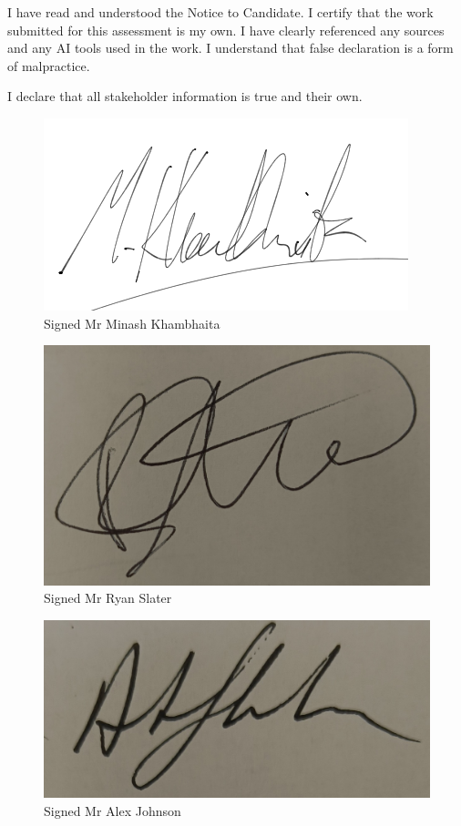 
\begin{declaration}

I have read and understood the Notice to Candidate. I certify that the work submitted for this assessment is my own. I have clearly referenced any sources and any AI tools used in the work. I understand that false declaration is a form of malpractice.

\end{declaration}


\begin{center}
I declare that all stakeholder information is true and their own.
\end{center}

\begin{figure}[!htbp]
	\centering
	\includegraphics[width=0.3\linewidth]{Images/sigdad.png}
	\caption{Signed Mr Minash Khambhaita}
\end{figure}


\begin{figure}[!htbp]
    \centering
    \includegraphics[width=0.3\linewidth]{IMG_20241213_124653362.jpg}
    \caption{Signed Mr Ryan Slater}
\end{figure}

\begin{figure}[!htbp]
    \centering
    \includegraphics[width=0.3\linewidth]{IMG_20241213_124653362~2.jpg}
    \caption{Signed Mr Alex Johnson}
\end{figure}


